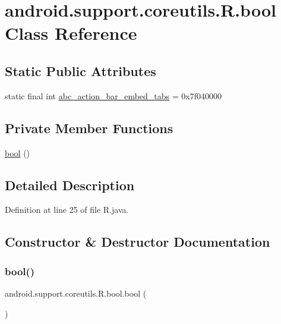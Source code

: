 \hypertarget{classandroid_1_1support_1_1coreutils_1_1_r_1_1bool}{}\section{android.\+support.\+coreutils.\+R.\+bool Class Reference}
\label{classandroid_1_1support_1_1coreutils_1_1_r_1_1bool}
\subsection*{Static Public Attributes}
\begin{DoxyCompactItemize}
\item 
static final int \mbox{\hyperlink{classandroid_1_1support_1_1coreutils_1_1_r_1_1bool_a823fbd5acb99b42be3b1595abf7aeadb}{abc\+\_\+action\+\_\+bar\+\_\+embed\+\_\+tabs}} = 0x7f040000
\end{DoxyCompactItemize}
\subsection*{Private Member Functions}
\begin{DoxyCompactItemize}
\item 
\mbox{\hyperlink{classandroid_1_1support_1_1coreutils_1_1_r_1_1bool_a547dfdb0eb318e0e67549c22fec3698e}{bool}} ()
\end{DoxyCompactItemize}


\subsection{Detailed Description}


Definition at line 25 of file R.\+java.



\subsection{Constructor \& Destructor Documentation}
\mbox{\label{classandroid_1_1support_1_1coreutils_1_1_r_1_1bool_a547dfdb0eb318e0e67549c22fec3698e}} 
\subsubsection{\texorpdfstring{bool()}{bool()}}
{\footnotesize\ttfamily android.\+support.\+coreutils.\+R.\+bool.\+bool (\begin{DoxyParamCaption}{ }\end{DoxyParamCaption})\hspace{0.3cm}{\ttfamily [private]}}



